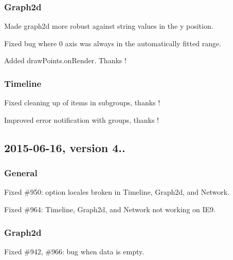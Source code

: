 \subsubsection*{Graph2d}


\begin{DoxyItemize}
\item Made graph2d more robust against string values in the y position.
\item Fixed bug where 0 axis was always in the automatically fitted range.
\item Added draw\+Points.\+on\+Render. Thanks !
\end{DoxyItemize}

\subsubsection*{Timeline}


\begin{DoxyItemize}
\item Fixed cleaning up of items in subgroups, thanks !
\item Improved error notification with groups, thanks !
\end{DoxyItemize}

\subsection*{2015-\/06-\/16, version 4..}

\subsubsection*{General}


\begin{DoxyItemize}
\item Fixed \#950\+: option {\ttfamily locales} broken in {\ttfamily Timeline}, {\ttfamily Graph2d}, and {\ttfamily Network}.
\item Fixed \#964\+: {\ttfamily Timeline}, {\ttfamily Graph2d}, and {\ttfamily Network} not working on I\+E9.
\end{DoxyItemize}

\subsubsection*{Graph2d}


\begin{DoxyItemize}
\item Fixed \#942, \#966\+: bug when data is empty.
\end{DoxyItemize}

